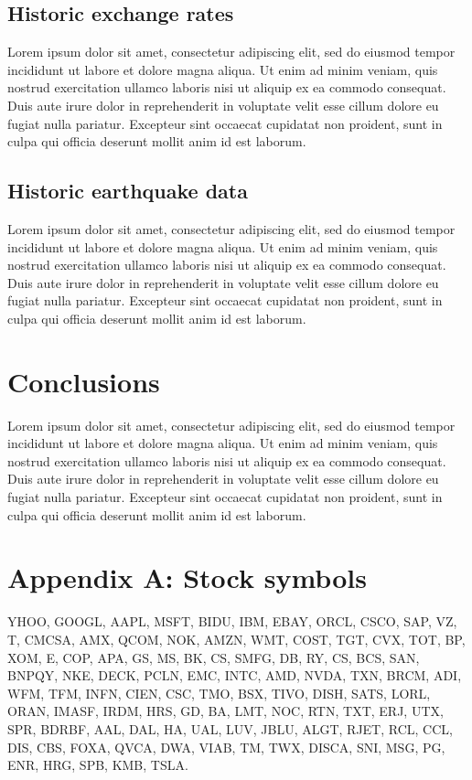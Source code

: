\documentclass{article}
\begin{document}
\subsection{Historic exchange rates}
Lorem ipsum dolor sit amet, consectetur adipiscing elit, sed do eiusmod tempor incididunt ut labore et dolore magna aliqua. Ut enim ad minim veniam, quis nostrud exercitation ullamco laboris nisi ut aliquip ex ea commodo consequat. Duis aute irure dolor in reprehenderit in voluptate velit esse cillum dolore eu fugiat nulla pariatur. Excepteur sint occaecat cupidatat non proident, sunt in culpa qui officia deserunt mollit anim id est laborum.


\subsection{Historic earthquake data}
Lorem ipsum dolor sit amet, consectetur adipiscing elit, sed do eiusmod tempor incididunt ut labore et dolore magna aliqua. Ut enim ad minim veniam, quis nostrud exercitation ullamco laboris nisi ut aliquip ex ea commodo consequat. Duis aute irure dolor in reprehenderit in voluptate velit esse cillum dolore eu fugiat nulla pariatur. Excepteur sint occaecat cupidatat non proident, sunt in culpa qui officia deserunt mollit anim id est laborum.



\section{Conclusions}
Lorem ipsum dolor sit amet, consectetur adipiscing elit, sed do eiusmod tempor incididunt ut labore et dolore magna aliqua. Ut enim ad minim veniam, quis nostrud exercitation ullamco laboris nisi ut aliquip ex ea commodo consequat. Duis aute irure dolor in reprehenderit in voluptate velit esse cillum dolore eu fugiat nulla pariatur. Excepteur sint occaecat cupidatat non proident, sunt in culpa qui officia deserunt mollit anim id est laborum.

\appendix
\section*{Appendix A: Stock symbols}
\label{AppA}

YHOO, GOOGL, AAPL, MSFT, BIDU, IBM, EBAY, ORCL, CSCO, SAP, VZ, T, CMCSA, AMX, QCOM, NOK, AMZN, WMT, COST, TGT, CVX, TOT, BP, XOM, E, COP, APA, GS, MS, BK, CS, SMFG, DB, RY, CS, BCS, SAN, BNPQY, NKE, DECK, PCLN, EMC, INTC, AMD, NVDA, TXN, BRCM, ADI, WFM, TFM, INFN, CIEN, CSC, TMO, BSX, TIVO, DISH, SATS, LORL, ORAN, IMASF, IRDM, HRS, GD, BA, LMT, NOC, RTN, TXT, ERJ, UTX, SPR, BDRBF, AAL, DAL, HA, UAL, LUV, JBLU, ALGT, RJET, RCL, CCL, DIS, CBS, FOXA, QVCA, DWA, VIAB, TM, TWX, DISCA, SNI, MSG, PG, ENR, HRG, SPB, KMB, TSLA.
\end{document}
